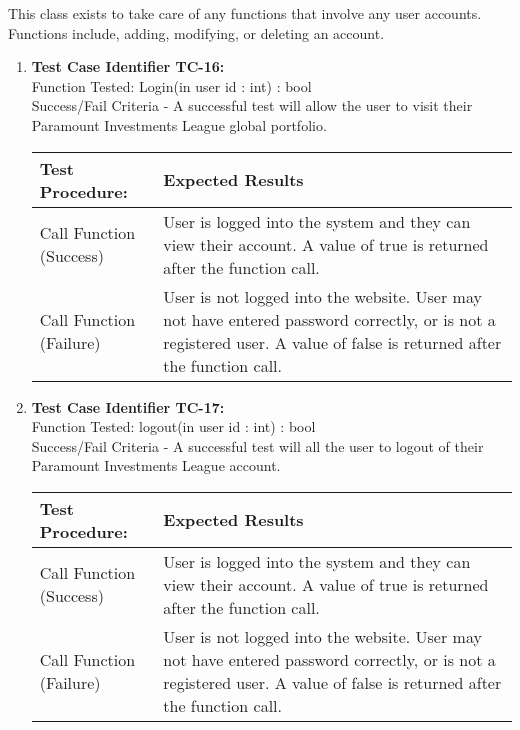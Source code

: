 This class exists to take care of any functions that involve any user accounts.
Functions include, adding, modifying, or deleting an account. \\

\begin{enumerate}
  \item
    \textbf{Test Case Identifier TC-16:}\\

    Function Tested: Login(in user id : int) : bool\\

    Success/Fail Criteria - A successful test will allow the user to visit their
    Paramount Investments League global portfolio. \\

    \begin{longtable}{|p{2in}|p{4.5in}|}
    \hline
    {\large \color{color1}Test Procedure:}&{\large \color{color1}Expected Results}\\ \hline
    Call Function (Success) & User is logged into the system and they can view
    their account. A value of true is returned after the function call.
    \\ \hline
    Call Function (Failure) & User is not logged into the website.  User may not
    have entered password correctly, or is not a registered user. A value of
    false is returned after the function call.\\ \hline
    \end{longtable}
    \vspace{5mm}

  \item
    \textbf{Test Case Identifier TC-17:}\\

    Function Tested: logout(in user id : int) : bool \\

    Success/Fail Criteria - A successful test will all the user to logout of
    their Paramount Investments League account. \\

    \begin{longtable}{|p{2in}|p{4.5in}|}
    \hline
    {\large \color{color1}Test Procedure:}&{\large \color{color1}Expected Results}\\ \hline
    Call Function (Success) & User is logged into the system and they can view
    their account. A value of true is returned after the function call.
    \\ \hline
    Call Function (Failure) & User is not logged into the website.  User may not
    have entered password correctly, or is not a registered user. A value of
    false is returned after the function call.\\ \hline
    \end{longtable}
    \vspace{5mm}


\end{enumerate}
